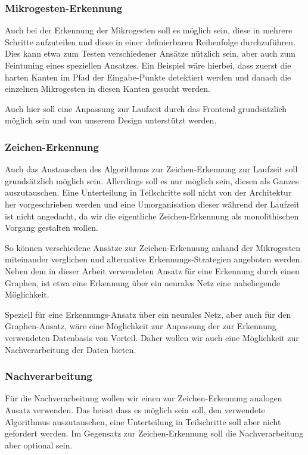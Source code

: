 \subsubsection{Mikrogesten-Erkennung}

Auch bei der Erkennung der Mikrogesten soll es möglich sein, diese in mehrere Schritte aufzuteilen und diese in einer definierbaren Reihenfolge durchzuführen. Dies kann etwa zum Testen verschiedener Ansätze nützlich sein, aber auch zum Feintuning eines speziellen Ansatzes. Ein Beispiel wäre hierbei, dass zuerst die harten Kanten im Pfad der Eingabe-Punkte detektiert werden und danach die einzelnen Mikrogesten in diesen Kanten gesucht werden.

Auch hier soll eine Anpassung zur Laufzeit durch das Frontend grundsätzlich möglich sein und von unserem Design unterstützt werden.

\subsubsection{Zeichen-Erkennung}

Auch das Austauschen des Algorithmus zur Zeichen-Erkennung zur Laufzeit soll grundsätzlich möglich sein. Allerdings soll es nur möglich sein, diesen als Ganzes auszutauschen. Eine Unterteilung in Teilschritte soll nicht von der Architektur her vorgeschrieben werden und eine Umorganisation dieser während der Laufzeit ist nicht angedacht, da wir die eigentliche Zeichen-Erkennung als monolithischen Vorgang gestalten wollen.

So können verschiedene Ansätze zur Zeichen-Erkennung anhand der Mikrogesten miteinander verglichen und alternative Erkennungs-Strategien angeboten werden. Neben dem in dieser Arbeit verwendeten Ansatz für eine Erkennung durch einen Graphen, ist etwa eine Erkennung über ein neurales Netz eine naheliegende Möglichkeit.

Speziell für eine Erkennungs-Ansatz über ein neurales Netz, aber auch für den Graphen-Ansatz, wäre eine Möglichkeit zur Anpassung der zur Erkennung verwendeten Datenbasis von Vorteil. Daher wollen wir auch eine Möglichkeit zur Nachverarbeitung der Daten bieten.

\subsubsection{Nachverarbeitung}

Für die Nachverarbeitung wollen wir einen zur Zeichen-Erkennung analogen Ansatz verwenden. Das heisst dass es möglich sein soll, den verwendete Algorithmus auszutauschen, eine Unterteilung in Teilschritte soll aber nicht gefordert werden. Im Gegensatz zur Zeichen-Erkennung soll die Nachverarbeitung aber optional sein.

